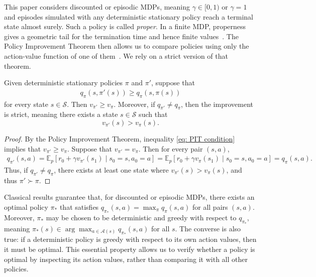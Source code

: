 This paper considers discounted or episodic MDPs,
meaning $\gamma \in [0,1)$
or $\gamma=1$ and episodes simulated with any deterministic stationary policy reach a terminal state almost surely. Such a policy is called \emph{proper}. In a finite MDP, properness gives a geometric tail for the termination time and hence finite values~\citep[Section~2.2.1, Eqs.~(2.7)--(2.9)]{Bertsekas1996Neuro-DynamicProgramming}.
The Policy Improvement Theorem then allows us to compare policies using only the action-value function of one of them~\citep{Howard1960DynamicProcesses}.
We rely on a strict version of that theorem.

\begin{lemma}
\label{thm: strict PIT}
Given deterministic stationary policies $\pi$ and $\pi'$, suppose that
\begin{align}
\label{eq: PIT condition}
q_\pi(s,\pi'(s)) \ge q_\pi(s,\pi(s))
\end{align}
for every state $s\in\mathcal S$.
Then \(v_{\pi'} \ge v_\pi\). Moreover, if \(q_{\pi'}\neq q_\pi\), then the improvement is strict, meaning
there exists a state \(s\in\mathcal S\) such that
\[
v_{\pi'}(s)>v_\pi(s).
\]
\end{lemma}
\begin{proof}
By the Policy Improvement Theorem, inequality \eqref{eq: PIT condition} implies that $v_{\pi'} \ge v_\pi$.
Suppose that $v_{\pi'} = v_{\pi}$. Then for every pair $(s,a)$,
\begin{align*}
q_{\pi'}(s,a)
= \mathbb E_p\!\left[r_0+\gamma v_{\pi'}(s_1)\mid s_0=s,a_0=a\right]
= \mathbb E_p\!\left[r_0+\gamma v_{\pi}(s_1)\mid s_0=s,a_0=a\right]
= q_{\pi}(s,a) .
\end{align*}
Thus, if $q_{\pi'} \neq q_\pi$, there exists at least one state where $v_{\pi'}(s) > v_{\pi}(s)$, and thus $\pi' \succ \pi$.
\end{proof}

Classical results guarantee that, for discounted or episodic MDPs,
there exists an optimal policy $\pi_*$ that satisfies $q_{\pi_*}(s,a) = \max_\pi q_\pi(s,a)$ for all pairs $(s,a)$.
Moreover, $\pi_*$ may be chosen to be deterministic and greedy with respect to $q_{\pi_*}$, meaning
$\pi_*(s) \in \arg\max_{a \in \mathcal A(s)} q_{\pi_*}(s,a)$ for all $s$.
The converse is also true: if a deterministic policy is greedy with respect to its own action values, then it must be optimal.
This essential property allows us to verify whether a policy is optimal by inspecting its action values, rather than comparing it with all other policies.

